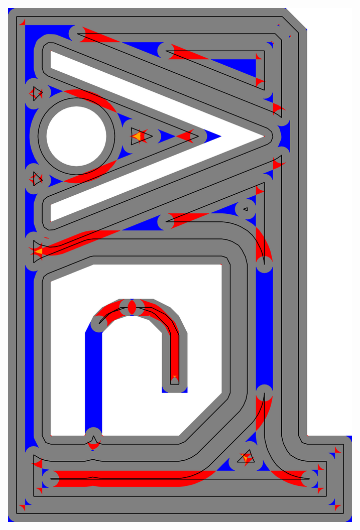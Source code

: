 \begin{figure}
\centering
\setlength{\figwidth}{0.19\textwidth}
\setlength{\figheight}{0.283\textwidth}
\begin{subfigure}{\figwidth}\centering
\includegraphics[height=\figheight]{sources/validation/gMAT_example/TEST_naive_accuracy.png}

\end{subfigure}
\end{figure}
